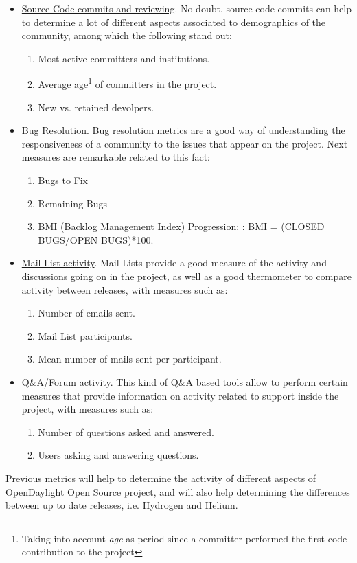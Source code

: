 \documentclass[a4paper, 12pt]{book}
\begin{document}
\begin{itemize}\itemsep0pt
\item{\underline{Source Code commits and reviewing}}. No doubt, source code commits can help to determine a lot of different aspects associated to demographics of the community, among which the following stand out:
\begin{enumerate}\itemsep0pt
\item{Most active committers and institutions}.
\item{Average age\footnote{Taking into account \emph{age} as period since a committer performed the first code contribution to the project} of committers in the project}.
\item{New vs. retained devolpers}.
\end{enumerate}
\item{\underline{Bug Resolution}}. Bug resolution metrics are a good way of understanding the responsiveness of a community to the issues that appear on the project. Next measures are remarkable related to this fact:
\begin{enumerate}\itemsep0pt
\item{Bugs to Fix}
\item{Remaining Bugs}
\item{BMI (Backlog Management Index) Progression: : BMI = (CLOSED BUGS/OPEN BUGS)*100}.
\end{enumerate}
\item{\underline{Mail List activity}}. Mail Lists provide a good measure of the activity and discussions going on in the project, as well as a good thermometer to compare activity between releases, with measures such as:
\begin{enumerate}\itemsep0pt
\item{Number of emails sent}.
\item{Mail List participants}.
\item{Mean number of mails sent per participant}.
\end{enumerate}
\item{\underline{Q\&A/Forum activity}}. This kind of Q\&A based tools allow to perform certain measures that provide information on activity related to support inside the project, with measures such as:
\begin{enumerate}\itemsep0pt
\item{Number of questions asked and answered}.
\item{Users asking and answering questions}.
\end{enumerate}
\end{itemize}
Previous metrics will help to determine the activity of different aspects of OpenDaylight Open Source project, and will also help determining the differences between up to date releases, i.e. Hydrogen and Helium.
\end{document}
